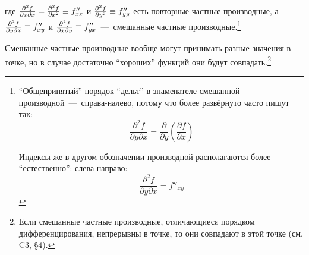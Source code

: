 \documentclass[a4paper,12pt]{article}
\begin{document}
  где $\frac{\partial^2 f}{\partial x \partial x} \hm= \frac{\partial^2 f}{\partial x^2} \hm\equiv f''_{xx}$ и $\frac{\partial^2 f}{\partial y^2} \hm\equiv f''_{yy}$ есть повторные частные производные, а $\frac{\partial^2 f}{\partial y \partial x} \hm\equiv f''_{xy}$ и $\frac{\partial^2 f}{\partial x \partial y} \hm\equiv f''_{yx}$~---~смешанные частные производные.\footnote{
    ``Общепринятый'' порядок ``дельт'' в знаменателе смешанной производной~---~справа-налево, потому что более развёрнуто часто пишут так:
    \[
      \frac{\partial^2 f}{\partial y \partial x} = \frac{\partial}{\partial y} \left(\frac{\partial f}{\partial x}\right)
    \]

    Индексы же в другом обозначении производной располагаются более ``естественно'': слева-направо:
    \[
      \frac{\partial^2 f}{\partial y \partial x} = f''_{xy}
    \]


    
    
  }

  Смешанные частные производные вообще могут принимать разные значения в точке, но в случае достаточно ``хороших'' функций они будут совпадать.\footnote{
    Если смешанные частные производные, отличающиеся порядком дифференцирования, непрерывны в точке, то они совпадают в этой точке (см. C3, \S 4).
  }
\end{document}
